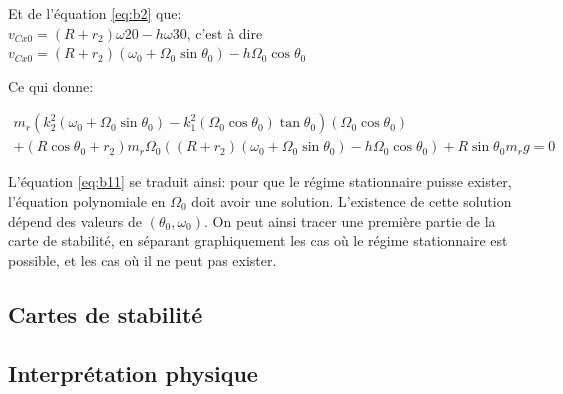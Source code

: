 Et de l'équation \ref{eq:b2} que:\\
$v_{Cx0}=(R+r_2)\omega{20}-h\omega{30}$, c'est à dire $v_{Cx0}=(R+r_2)(\omega_0 + \Omega_0 \sin{\theta_0})-h\Omega_0 \cos{\theta_0}$

Ce qui donne:

\begin{equation}
 \begin{split}
     m_r(k_2^2(\omega_0 + \Omega_0 \sin{\theta_0})-k_1^2(\Omega_0 \cos{\theta_0}) \tan{\theta_0})(\Omega_0 \cos{\theta_0})\\
    +(R\cos{\theta_0}+r_2)m_r \Omega_0 ((R+r_2)(\omega_0 + \Omega_0 \sin{\theta_0})-h\Omega_0 \cos{\theta_0}) + R\sin{\theta_0}m_r g =0
 \end{split}
  \label{eq:b11}
\end{equation}

L'équation \ref{eq:b11} se traduit ainsi: pour que le régime stationnaire puisse exister, l'équation polynomiale en $\Omega_0$ doit avoir une solution. L'existence de cette solution dépend des valeurs de $(\theta_0,\omega_0)$. On peut ainsi tracer une première partie de la carte de stabilité, en séparant graphiquement les cas où le régime stationnaire est possible, et les cas où il ne peut pas exister.





\subsection{Cartes de stabilité}

\subsection{Interprétation physique}








































